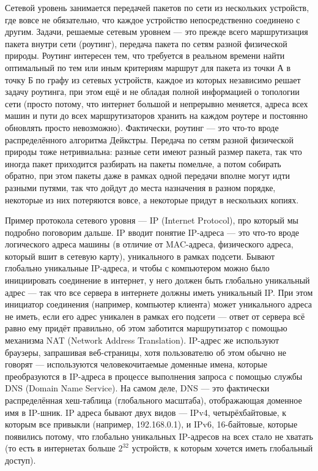 \documentclass{../../text-style}
\begin{document}
Сетевой уровень занимается передачей пакетов по сети из нескольких устройств, где вовсе не обязательно, что каждое устройство непосредственно соединено с другим. Задачи, решаемые сетевым уровнем --- это прежде всего маршрутизация пакета внутри сети (роутинг), передача пакета по сетям разной физической природы. Роутинг интересен тем, что требуется в реальном времени найти оптимальный по тем или иным критериям маршрут для пакета из точки А в точку Б по графу из сетевых устройств, каждое из которых независимо решает задачу роутинга, при этом ещё и не обладая полной информацией о топологии сети (просто потому, что интернет большой и непрерывно меняется, адреса всех машин и пути до всех маршрутизаторов хранить на каждом роутере и постоянно обновлять просто невозможно). Фактически, роутинг --- это что-то вроде распределённого алгоритма Дейкстры. Передача по сетям разной физической природы тоже нетривиальна: разные сети имеют разный размер пакета, так что иногда пакет приходится разбирать на пакеты помельче, а потом собирать обратно, при этом пакеты даже в рамках одной передачи вполне могут идти разными путями, так что дойдут до места назначения в разном порядке, некоторые из них потеряются вовсе, а некоторые придут в нескольких копиях.

Пример протокола сетевого уровня --- IP (Internet Protocol), про который мы подробно поговорим дальше. IP вводит понятие IP-адреса --- это что-то вроде логического адреса машины (в отличие от MAC-адреса, физического адреса, который вшит в сетевую карту), уникального в рамках подсети. Бывают глобально уникальные IP-адреса, и чтобы с компьютером можно было инициировать соединение в интернет, у него должен быть глобально уникальный адрес --- так что все сервера в интернете должны иметь уникальный IP. При этом инициатор соединения (например, компьютер клиента) может уникального адреса не иметь, если его адрес уникален в рамках его подсети --- ответ от сервера всё равно ему придёт правильно, об этом заботится маршрутизатор с помощью механизма NAT (Network Address Translation). IP-адрес же используют браузеры, запрашивая веб-страницы, хотя пользователю об этом обычно не говорят --- используются человекочитаемые доменные имена, которые преобразуются в IP-адреса в процессе выполнения запроса с помощью службы DNS (Domain Name Service). На самом деле, DNS --- это фактически распределённая хеш-таблица (глобального масштаба), отображающая доменное имя в IP-шник. IP адреса бывают двух видов --- IPv4, четырёхбайтовые, к которым все привыкли (например, 192.168.0.1), и IPv6, 16-байтовые, которые появились потому, что глобально уникальных IP-адресов на всех стало не хватать (то есть в интернетах больше $2^{32}$ устройств, к которым хочется иметь глобальный доступ).
\end{document}
